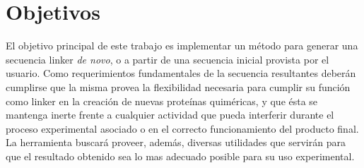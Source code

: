 \section{Objetivos}


El objetivo principal de este trabajo es implementar un método para generar una secuencia linker \textit{de novo}, o a partir de una secuencia inicial provista por el usuario. 
Como requerimientos fundamentales de la secuencia resultantes deberán cumplirse que la misma provea la flexibilidad necesaria para cumplir su función como linker en la creación de nuevas proteínas quiméricas, 
y que ésta se mantenga inerte frente a cualquier actividad que pueda interferir durante el proceso experimental asociado o en el correcto funcionamiento del producto final.
La herramienta buscará proveer, además, diversas utilidades que servirán para que el resultado obtenido sea lo mas adecuado posible para su uso experimental. 


